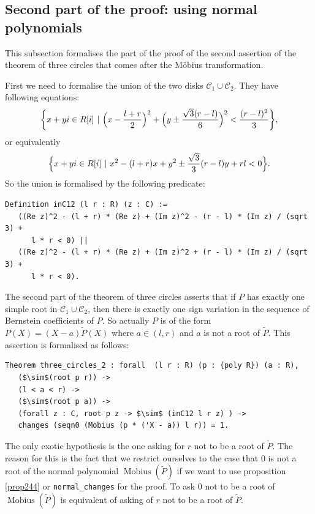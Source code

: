 \documentclass[11pt, a4paper]{article}
\DeclareMathOperator{\Mob}{M{o}bius}
\newcommand{\wt}{\widetilde}
\newcommand{\ssc}{{\mathcal C}}
\begin{document}
\subsection{Second part of the proof: using normal polynomials}
\label{second_coq}

This subsection formalises the part of the proof of the second assertion of the theorem of three circles that comes after the M\"obius transformation.

First we need to formalise the union of the two disks $\ssc_1 \cup \ssc_2$. They have following equations:
\[\biggl\{x + yi \in R[i] \phantom{i} | \phantom{i} \Bigl(x - \frac{l+r}{2} \Bigr)^2 + \Bigl(y \pm \frac{\sqrt{3}(r-l)}{6}\Bigr)^2 < \frac{(r-l)^2}{3} \biggr\},\]
or equivalently
\[\Bigl\{x + yi \in R[i] \phantom{i} | \phantom{i} x^2 - (l + r)x + y^2 \pm \frac{\sqrt{3}}{3} (r-l) y+ rl < 0\Bigr\}.\]
So the union is formalised by the following predicate:
\begin{lstlisting}
Definition inC12 (l r : R) (z : C) :=
   ((Re z)^2 - (l + r) * (Re z) + (Im z)^2 - (r - l) * (Im z) / (sqrt 3) +
      l * r < 0) ||
   ((Re z)^2 - (l + r) * (Re z) + (Im z)^2 + (r - l) * (Im z) / (sqrt 3) +
      l * r < 0).
\end{lstlisting}
The second part of the theorem of three circles asserts that if $P$ has exactly one simple root in $\ssc_1 \cup \ssc_2$, then there is exactly one sign variation in the sequence of Bernstein coefficients of $P$. So actually $P$ is of the form $P(X) = (X - a)\wt{P}(X)$ where $a \in (l,r)$ and $a$ is not a root of $\wt{P}$.
This assertion is formalised as follows:
\begin{lstlisting}
Theorem three_circles_2 : forall  (l r : R) (p : {poly R}) (a : R),
   ($\sim$(root p r)) ->
   (l < a < r) ->
   ($\sim$(root p a)) ->
   (forall z : C, root p z -> $\sim$ (inC12 l r z) ) ->
   changes (seqn0 (Mobius (p * ('X - a)) l r)) = 1.
\end{lstlisting}
The only exotic hypothesis is the one asking for $r$ not to be a root of $\wt{P}$. The reason for this is the fact that we restrict ourselves to the case that $0$ is not a root of the normal polynomial $\Mob(\wt{P})$ if we want to use proposition \ref{prop244} or \lstinline!normal_changes! for the proof. To ask $0$ not to be a root of  $\Mob(\wt{P})$ is equivalent of asking of $r$ not to be a root of $\wt{P}$.%
\end{document}
